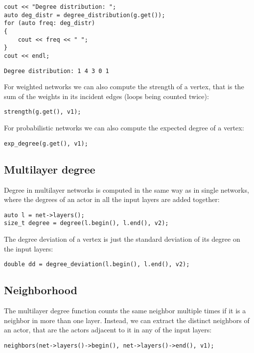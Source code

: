 \begin{lstlisting}[style=c++] 
cout << "Degree distribution: ";
auto deg_distr = degree_distribution(g.get());
for (auto freq: deg_distr)
{
    cout << freq << " ";
}
cout << endl;
\end{lstlisting}
\begin{lstlisting}[style=out]
Degree distribution: 1 4 3 0 1 
\end{lstlisting}

For weighted networks we can also compute the strength of a vertex, that is the sum of the weights in its incident edges (loops being counted twice):
\begin{lstlisting}[style=c++]
strength(g.get(), v1);
\end{lstlisting}

For probabilistic networks we can also compute the expected degree of a vertex:
\begin{lstlisting}[style=c++]
exp_degree(g.get(), v1);
\end{lstlisting}

\subsection{Multilayer degree}

Degree in multilayer networks is computed in the same way as in single networks, where the degrees of an actor in all the input layers are added together:
\begin{lstlisting}[style=c++] 
auto l = net->layers();
size_t degree = degree(l.begin(), l.end(), v2);
\end{lstlisting}

The degree deviation of a vertex is just the standard deviation of its degree on the input layers:
\begin{lstlisting}[style=c++] 
double dd = degree_deviation(l.begin(), l.end(), v2);
\end{lstlisting}

\subsection{Neighborhood}

The multilayer degree function counts the same neighbor multiple times if it is a neighbor in more than one layer. Instead, we can extract the distinct neighbors of an actor, that are the actors adjacent to it in any of the input layers:
\begin{lstlisting}[style=c++] 
neighbors(net->layers()->begin(), net->layers()->end(), v1);
\end{lstlisting}

